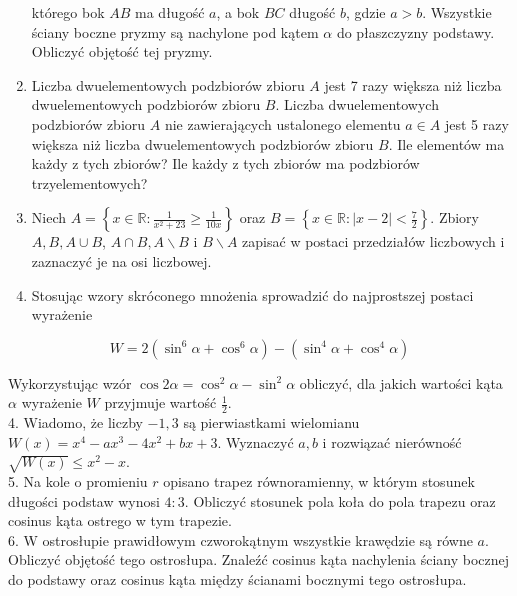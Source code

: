 \documentclass[10pt]{article}
\begin{document}
\begin{enumerate}
którego bok $A B$ ma długość $a$, a bok $B C$ długość $b$, gdzie $a>b$. Wszystkie ściany boczne pryzmy są nachylone pod kątem $\alpha$ do płaszczyzny podstawy. Obliczyć objętość tej pryzmy.
  \item Liczba dwuelementowych podzbiorów zbioru $A$ jest 7 razy większa niż liczba dwuelementowych podzbiorów zbioru $B$. Liczba dwuelementowych podzbiorów zbioru $A$ nie zawierających ustalonego elementu $a \in A$ jest 5 razy większa niż liczba dwuelementowych podzbiorów zbioru $B$. Ile elementów ma każdy z tych zbiorów? Ile każdy z tych zbiorów ma podzbiorów trzyelementowych?
  \item Niech $A=\left\{x \in \mathbb{R}: \frac{1}{x^{2}+23} \geqslant \frac{1}{10 x}\right\}$ oraz $B=\left\{x \in \mathbb{R}:|x-2|<\frac{7}{2}\right\}$. Zbiory $A, B, A \cup B$, $A \cap B, A \backslash B$ i $B \backslash A$ zapisać w postaci przedziałów liczbowych i zaznaczyć je na osi liczbowej.
  \item Stosując wzory skróconego mnożenia sprowadzić do najprostszej postaci wyrażenie
\end{enumerate}

$$
W=2\left(\sin ^{6} \alpha+\cos ^{6} \alpha\right)-\left(\sin ^{4} \alpha+\cos ^{4} \alpha\right)
$$

Wykorzystując wzór $\cos 2 \alpha=\cos ^{2} \alpha-\sin ^{2} \alpha$ obliczyć, dla jakich wartości kąta $\alpha$ wyrażenie $W$ przyjmuje wartość $\frac{1}{2}$.\\
4. Wiadomo, że liczby $-1,3$ są pierwiastkami wielomianu $W(x)=x^{4}-a x^{3}-4 x^{2}+b x+3$. Wyznaczyć $a, b$ i rozwiązać nierówność $\sqrt{W(x)} \leqslant x^{2}-x$.\\
5. Na kole o promieniu $r$ opisano trapez równoramienny, w którym stosunek długości podstaw wynosi $4: 3$. Obliczyć stosunek pola koła do pola trapezu oraz cosinus kąta ostrego w tym trapezie.\\
6. W ostrosłupie prawidłowym czworokątnym wszystkie krawędzie są równe $a$. Obliczyć objętość tego ostrosłupa. Znaleźć cosinus kąta nachylenia ściany bocznej do podstawy oraz cosinus kąta między ścianami bocznymi tego ostrosłupa.
\end{document}
